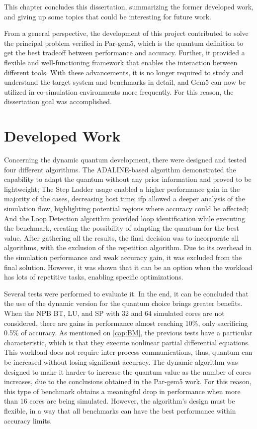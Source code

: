 

This chapter concludes this dissertation, summarizing the former developed work, and giving up some topics that could be
interesting for future work.

From a general perspective, the development of this project contributed to solve the principal problem verified in Par-gem5, which is the 
quantum definition to get the best tradeoff between performance and accuracy. Further, it provided a flexible and well-functioning framework 
that enables the interaction between different tools. With these advancements, it is no longer required to study and understand 
the target system and benchmarks in detail, and Gem5 can now be utilized in co-simulation environments more frequently.
For this reason, the dissertation goal was accomplished. 

\section{Developed Work}

Concerning the dynamic quantum development, there were designed and tested four different algorithms. 
The ADALINE-based algorithm demonstrated the capability to adapt the quantum without any prior information and proved to be lightweight;
The Step Ladder usage enabled a higher performance gain in the majority of the cases, decreasing host time; 
\gls{ifp} allowed a deeper analysis of the simulation flow, highlighting potential regions where accuracy could be affected; And the Loop Detection 
algorithm provided loop identification while executing the benchmark, creating the possibility of adapting the quantum 
for the best value. 
After gathering all the results, the final decision was to incorporate all algorithms, with the exclusion of the repetition algorithm.
Due to its overhead in the simulation performance and weak accuracy gain, it was excluded from the final solution. However, it was shown 
that it can be an option when the workload has lots of repetitive tasks, enabling specific optimizations.

Several tests were performed to evaluate it. In the end, it can be concluded that the use of the dynamic version for the quantum choice brings 
greater benefits. When the NPB BT, LU, and SP with 32 and 64 simulated cores are not considered, there are gains in performance almost 
reaching 10\%, only sacrificing 0.5\% of accuracy. As mentioned on \autoref{cap:BM}, the previous tests have a particular characteristic, 
which is that they execute nonlinear partial differential equations. This workload does not require inter-process communications, thus, 
quantum can be increased without losing significant accuracy. The dynamic algorithm was designed to make it harder to increase the 
quantum value as the number of cores increases, due to the conclusions obtained in the Par-gem5 \cite*{pargem5} work. For this reason, 
this type of benchmark obtains a meaningful drop in performance when more than 16 cores are being simulated. However, the 
algorithm's design must be flexible, in a way that all benchmarks can have the best performance within accuracy limits.

